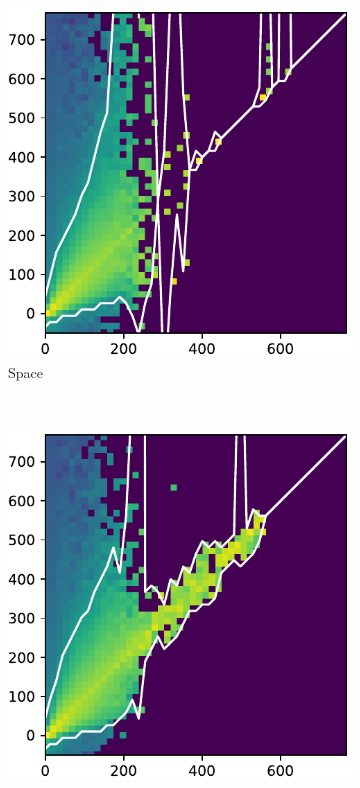 \documentclass[10pt,letterpaper]{article}
\begin{document}
\begin{figure}[h!]
\begin{subfigure}[t]{0.288\textwidth}
				\includegraphics[width=\textwidth]{fig/hist_1}
					\caption{Space}
				\end{subfigure}
				~ 
				\begin{subfigure}[t]{0.288\textwidth}
					\centering
					\includegraphics[width=\textwidth]{fig/hist_2}

\end{subfigure}
\end{figure}
\end{document}
